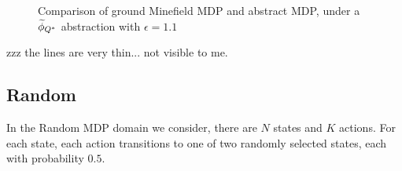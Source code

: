 \begin{figure}
\label{fig:minefield-visual}
\caption{Comparison of ground Minefield \ac{MDP} and abstract \ac{MDP}, under a $\widetilde \phi_{Q^*}$ abstraction with $\epsilon=1.1$}
\end{figure} 
zzz the lines are very thin... not visible to me.

\subsection{Random}

In the Random \ac{MDP} domain we consider, there are $N$ states and $K$ actions. For each state, each action transitions to one of two randomly selected states, each with probability $0.5$.


